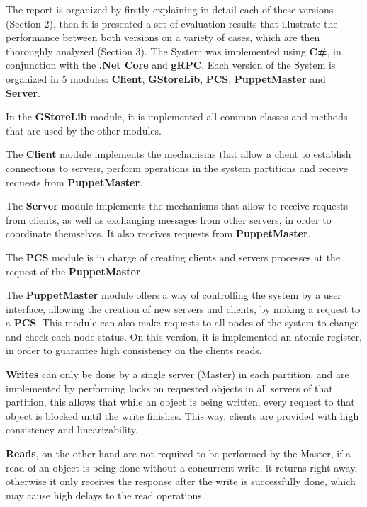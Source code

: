 \documentclass[times, 10pt,twocolumn]{article}
\begin{document}
The report is organized by firstly explaining in detail each of these versions (Section 2), then it is presented a set of evaluation results that illustrate the performance between both versions on a variety of cases, which are then thoroughly analyzed (Section 3).
The System was implemented using \textbf{C\#}, in conjunction with the \textbf{.Net Core} and \textbf{gRPC}.
Each version of the System is organized in 5 modules:  \textbf{Client}, \textbf{GStoreLib}, \textbf{PCS}, \textbf{PuppetMaster} and \textbf{Server}.

In the \textbf{GStoreLib} module, it is implemented all common classes and methods that are used by the other modules.

The \textbf{Client} module implements the mechanisms that allow a client to establish connections to servers, perform operations in the system partitions and receive requests from \textbf{PuppetMaster}.

The \textbf{Server} module implements the mechanisms that allow to receive requests from clients, as well as exchanging messages from other servers, in order to coordinate themselves. It also receives requests from \textbf{PuppetMaster}.

The \textbf{PCS} module is in charge of creating clients and servers processes at the request of the \textbf{PuppetMaster}.

The \textbf{PuppetMaster} module offers a way of controlling the system by a user interface, allowing the creation of new  servers and clients, by making a request to a \textbf{PCS}. This module can also make requests to all nodes of the system to change and check each node status.
On this version, it is implemented an atomic register, in order to guarantee high consistency on the clients reads.

\textbf{Writes} can only be done by a single server (Master) in each partition, and are implemented by performing locks on requested objects in all servers of that partition, this allows that while an object is being written, every request to that object is blocked until the write finishes. This way, clients are provided with high consistency and linearizability.

\textbf{Reads}, on the other hand are not required to be performed by the Master, if a read of an object is being done without a concurrent write, it returns right away, otherwise it only receives the response after the write is successfully done, which may cause high delays to the read operations.
\end{document}
